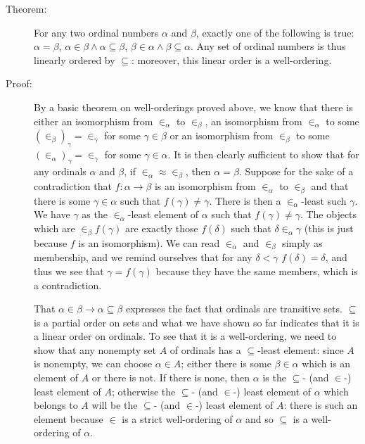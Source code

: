 \documentclass[12pt]{book}
\begin{document}
\begin{description}
\item[Theorem:] For any two ordinal numbers $\alpha$ and $\beta$,
exactly one of the following is true: $\alpha=\beta$, $\alpha\in \beta
\wedge \alpha\subseteq \beta$, $\beta \in \alpha \wedge \beta
\subseteq \alpha$.  Any set of ordinal numbers is thus linearly
ordered by $\subseteq$: moreover, this linear order is a
well-ordering.

\item[Proof:] By a basic theorem on well-orderings proved above, we
know that there is either an isomorphism from $\in_{\alpha}$ to
$\in_{\beta}$, an isomorphism from $\in_{\alpha}$ to some
$(\in_{\beta})_{\gamma} = \in_{\gamma}$ for some $\gamma \in \beta$ or
an isomorphism from $\in_{\beta}$ to some $(\in_{\alpha})_{\gamma} =
\in_{\gamma}$ for some $\gamma \in \alpha$.  It is then clearly
sufficient to show that for any ordinals $\alpha$ and $\beta$, if
$\in_{\alpha} \approx \in_{\beta}$, then $\alpha=\beta$.  Suppose for
the sake of a contradiction that $f:\alpha \rightarrow \beta$ is an
isomorphism from $\in_{\alpha}$ to $\in_{\beta}$ and that there is
some $\gamma \in \alpha$ such that $f(\gamma) \neq \gamma$.  There is
then a $\in_{\alpha}$-least such $\gamma$.  We have $\gamma$ as the
$\in_{\alpha}$-least element of $\alpha$ such that $f(\gamma) \neq
\gamma$.  The objects which are $\in_{\beta} f(\gamma)$ are exactly
those $f(\delta)$ such that $\delta \in_{\alpha} \gamma$ (this is just
because $f$ is an isomorphism).  We can read $\in_{\alpha}$ and
$\in_{\beta}$ simply as membership, and we remind ourselves that for
any $\delta<\gamma$ $f(\delta) = \delta$, and thus we see that
$\gamma=f(\gamma)$ because they have the same members, which is a
contradiction.

That $\alpha \in \beta \rightarrow \alpha\subseteq \beta$ expresses
the fact that ordinals are transitive sets.  $\subseteq$ is a partial
order on sets and what we have shown so far indicates that it is a
linear order on ordinals.  To see that it is a well-ordering, we need
to show that any nonempty set $A$ of ordinals has a $\subseteq$-least
element: since $A$ is nonempty, we can choose $\alpha \in A$; either
there is some $\beta \in \alpha$ which is an element of $A$ or there
is not.  If there is none, then $\alpha$ is the $\subseteq$- (and
$\in$-) least element of $A$; otherwise the $\subseteq$- (and $\in$-)
least element of $\alpha$ which belongs to $A$ will be the
$\subseteq$- (and $\in$-) least element of $A$: there is such an
element because $\in$ is a strict well-ordering of $\alpha$ and so
$\subseteq$ is a well-ordering of $\alpha$.


\end{description}
\end{document}
